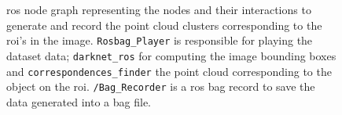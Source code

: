\begin{landscape}
\begin{figure}[!ht]
	\centering
	\def\svgwidth{\columnwidth}
	\graphicspath{{img/lidar-interference/human/}}
	
	\caption[\ac{ros} node graph to implement the \acp{roi} recording for later analysis.]{\ac{ros} node graph representing the nodes and their interactions to generate and record the point cloud clusters corresponding to the \ac{roi}'s in the image. \texttt{Rosbag\_Player} is responsible for playing the dataset data; \texttt{darknet\_ros} for computing the image bounding boxes and \texttt{correspondences\_finder} the point cloud corresponding to the object on the \ac{roi}. \texttt{/Bag\_Recorder} is a \ac{ros} bag record to save the data generated into a bag file.}
	\label{fig:human-roi-generation}
\end{figure}


	
\end{landscape} 
